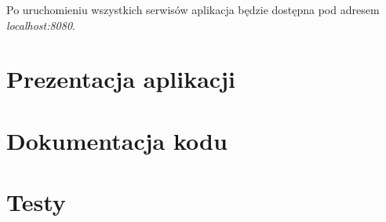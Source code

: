 Po uruchomieniu wszystkich serwisów aplikacja będzie dostępna pod adresem \textit{localhost:8080}.

\section{Prezentacja aplikacji}\label{sec:app-presentation}

\section{Dokumentacja kodu}\label{sec:code-documentation}
\section{Testy}\label{sec:tests}
\thispagestyle{normal}
